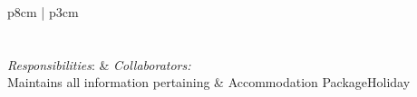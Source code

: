 \begin{center}
\renewcommand{\arraystretch}{1.5}
\begin{tabu}{p{8cm} | p{3cm}}
	 \\
	\toprule
	 \\
	\midrule
	 \\
	\midrule
	\emph{Responsibilities}: & \emph{Collaborators:} \\
	\midrule
	Maintains all information pertaining &
		Accommodation \newline
		PackageHoliday \\
	\bottomrule
\end{tabu}
\end{center}